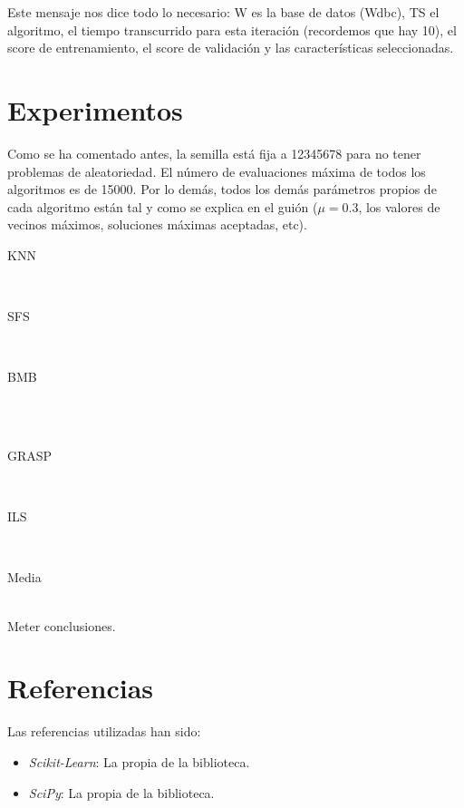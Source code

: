 \documentclass[a4paper, 11pt]{article}
\begin{document}
    Este mensaje nos dice todo lo necesario: W es la base de datos (Wdbc), TS el algoritmo, el tiempo transcurrido para esta iteración (recordemos que hay 10), el score de entrenamiento, el score de validación y las características seleccionadas.
  \section{Experimentos}
    Como se ha comentado antes, la semilla está fija a 12345678 para no tener problemas de aleatoriedad. El número de evaluaciones máxima de todos los algoritmos es de 15000. Por lo demás, todos los demás parámetros propios de cada algoritmo están tal y como se explica en el guión ($\mu=0.3$, los valores de vecinos máximos, soluciones máximas aceptadas, etc). \\

    \newpage

    \centerline{KNN}
    \\
    \centerline{SFS}
    
    \\ \centerline{BMB}
    \\
    \\ \centerline{GRASP}
    
    \\ \centerline{ILS}
     \\
    \newpage
    \centerline{Media}
    \\

    Meter conclusiones.



  \section{Referencias}

  Las referencias utilizadas han sido:
  \begin{itemize}
    \item \emph{Scikit-Learn}: La propia  de la biblioteca.
    \item \emph{SciPy}: La propia  de la biblioteca.
  \end{itemize}
\end{document}
